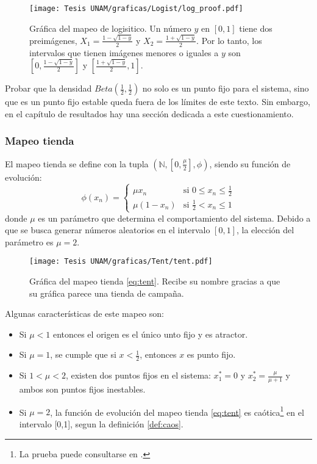\documentclass[../Main.tex]{subfiles}
\begin{document}
\begin{figure}[h]
    \centering
    \texttt{[image: Tesis UNAM/graficas/Logist/log\_proof.pdf]}
    \caption{Gráfica del mapeo de logisitico. Un número $y$ en $[0,1]$ tiene dos preimágenes, $X_1=\frac{1-\sqrt{1-y}}{2}$ y $X_2=\frac{1+\sqrt{1-y}}{2}$. Por lo tanto, los intervalos que tienen imágenes menores o iguales a $y$ son $\left[0,\frac{1-\sqrt{1-y}}{2}\right]$ y $\left[\frac{1+\sqrt{1-y}}{2},1\right]$.}
    \label{fig:log_proof}
\end{figure} 
Probar que la densidad $Beta\left(\frac{1}{2},\frac{1}{2}\right)$ no solo es un punto fijo para el sistema, sino que es un punto fijo estable queda fuera de los límites de este texto. Sin embargo, en el capítulo de resultados hay una sección dedicada a este cuestionamiento.  



\subsubsection{Mapeo tienda}
El mapeo tienda se define con la tupla $(\mathbb{N},[0,\frac{\mu}{2}],\phi)$, siendo su función de evolución:
\begin{equation}
    \label{eq:tent}
\phi(x_{n}) = 
\begin{cases} 
\mu x_n & \text{si } 0 \le x_n \le \frac{1}{2} \\
\mu (1 - x_n) & \text{si } \frac{1}{2} < x_n \le 1 
\end{cases}
\end{equation}
donde $\mu$ es un parámetro que determina el comportamiento del sistema. Debido a que se busca generar números aleatorios en el intervalo $[0,1]$, la elección del parámetro es $\mu=2$.
\begin{figure}[h]
    \centering
    \texttt{[image: Tesis UNAM/graficas/Tent/tent.pdf]}
    \caption{Gráfica del mapeo tienda \ref{eq:tent}. Recibe su nombre gracias a que su gráfica parece una tienda de campaña.}
    \label{fig:tent_proof}
\end{figure} 

Algunas características de este mapeo son:

\begin{itemize}
    \item Si $\mu<1$ entonces el origen es el único unto fijo y es atractor.
    \item Si $\mu=1$, se cumple que si $x<\frac{1}{2}$, entonces $x$ es punto fijo.
    \item Si $1<\mu<2$, existen dos puntos fijos en el sistema: $x^*_1=0$ y $x^*_2=\frac{\mu}{\mu +1}$ y ambos son puntos fijos inestables.
    \item Si $\mu=2$, la función de evolución del mapeo tienda \ref{eq:tent} es caótica\footnote{La prueba puede consultarse en \cite{KingMendez2014}.} en el intervalo [0,1], segun la definición \ref{def:caos}.
\end{itemize}
\end{document}
